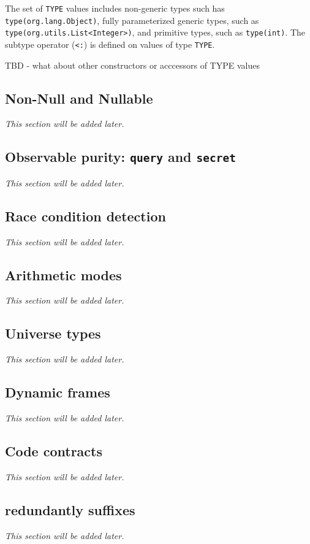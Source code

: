 The set of \texttt{\bs TYPE} values includes non-generic types such has \texttt{\bs type(org.lang.Object)}, fully parameterized generic types, such as \texttt{\bs type(org.utils.List<Integer>)}, and primitive types, such as \texttt{\bs type(int)}. 
The subtype operator (\texttt{<:}) is defined on values of type \texttt{\bs TYPE}.

TBD - what about other constructors or acccessors of TYPE values 


\subsection{Non-Null and Nullable}
\textit{This section will be added later.} %

\subsection{Observable purity: \texttt{\bs query} and \texttt{\bs secret}}
\textit{This section will be added later.} %

\subsection{Race condition detection}
\textit{This section will be added later.} %

\subsection{Arithmetic modes}
\textit{This section will be added later.} %

\subsection{Universe types}
\textit{This section will be added later.} %

\subsection{Dynamic frames}
\textit{This section will be added later.} %

\subsection{Code contracts}
\textit{This section will be added later.} %

\subsection{redundantly suffixes}
\textit{This section will be added later.} %

